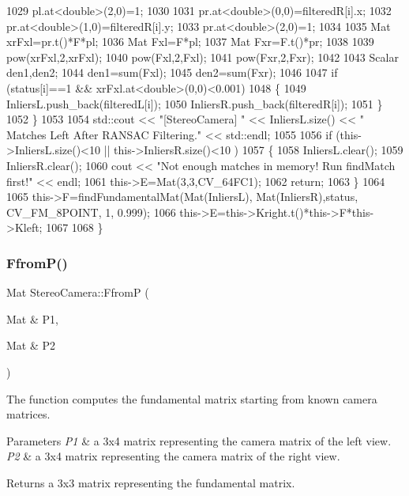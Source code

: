 \begin{DoxyCode}
1029         pl.at<\textcolor{keywordtype}{double}>(2,0)=1;
1030 
1031         pr.at<\textcolor{keywordtype}{double}>(0,0)=filteredR[i].x;
1032         pr.at<\textcolor{keywordtype}{double}>(1,0)=filteredR[i].y;
1033         pr.at<\textcolor{keywordtype}{double}>(2,0)=1;
1034 
1035         Mat xrFxl=pr.t()*F*pl;
1036         Mat Fxl=F*pl;
1037         Mat Fxr=F.t()*pr;
1038 
1039         pow(xrFxl,2,xrFxl);
1040         pow(Fxl,2,Fxl);
1041         pow(Fxr,2,Fxr);
1042 
1043         Scalar den1,den2;
1044         den1=sum(Fxl);
1045         den2=sum(Fxr);
1046 
1047         \textcolor{keywordflow}{if} (status[i]==1 && xrFxl.at<\textcolor{keywordtype}{double}>(0,0)<0.001)
1048         \{
1049             InliersL.push\_back(filteredL[i]);
1050             InliersR.push\_back(filteredR[i]);
1051         \}
1052     \}
1053 
1054     std::cout << \textcolor{stringliteral}{"[StereoCamera] "} << InliersL.size() << \textcolor{stringliteral}{" Matches Left After RANSAC Filtering."} << 
      std::endl;
1055 
1056     \textcolor{keywordflow}{if} (this->InliersL.size()<10 || this->InliersR.size()<10 )
1057     \{
1058         InliersL.clear();
1059         InliersR.clear();
1060         cout << \textcolor{stringliteral}{"Not enough matches in memory! Run findMatch first!"} << endl;
1061         this->E=Mat(3,3,CV\_64FC1);
1062         \textcolor{keywordflow}{return};
1063     \}
1064 
1065     this->F=findFundamentalMat(Mat(InliersL), Mat(InliersR),status, CV\_FM\_8POINT, 1, 0.999);
1066     this->E=this->Kright.t()*this->F*this->Kleft;
1067 
1068 \}
\end{DoxyCode}
\mbox{\label{classStereoCamera_a3fe4e87322f8644cd21ce06e8522c815}} 
\subsubsection{\texorpdfstring{Ffrom\+P()}{FfromP()}}
{\footnotesize\ttfamily Mat Stereo\+Camera\+::\+FfromP (\begin{DoxyParamCaption}\item[{Mat \&}]{P1,  }\item[{Mat \&}]{P2 }\end{DoxyParamCaption})}



The function computes the fundamental matrix starting from known camera matrices. 


\begin{DoxyParams}{Parameters}
{\em P1} & a 3x4 matrix representing the camera matrix of the left view. \\
\hline
{\em P2} & a 3x4 matrix representing the camera matrix of the right view. \\
\hline
\end{DoxyParams}
\begin{DoxyReturn}{Returns}
a 3x3 matrix representing the fundamental matrix. 
\end{DoxyReturn}


